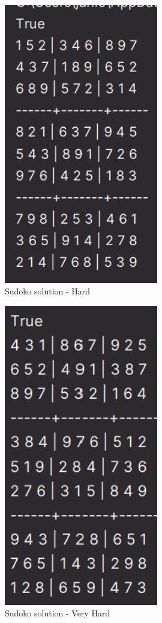 \documentclass[11pt]{article}
\begin{document}
\begin{figure}[h!]
    \centering
    \includegraphics[width=0.6\textwidth]{images/sudoko_hard}
    \caption{Sudoko solution - Hard}
    \label{fig:hard}
\end{figure}

\begin{figure}[h!]
    \centering
    \includegraphics[width=0.6\textwidth]{images/sudoko_very_hard}
    \caption{Sudoko solution - Very Hard}
    \label{fig:very-hard}
\end{figure}
\end{document}
